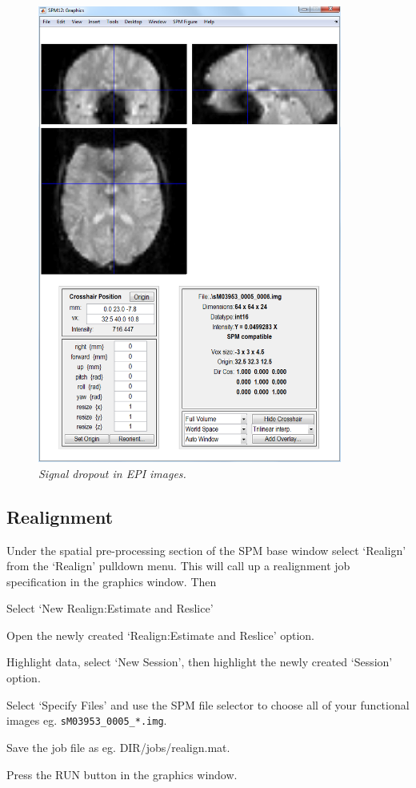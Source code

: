 \begin{figure}
\begin{center}
\includegraphics[width=100mm]{faces/dropout}
\caption{\em Signal dropout in EPI images. \label{dropout}}
\end{center}
\end{figure}

\subsection{Realignment}

Under the spatial pre-processing section of the SPM base window select `Realign' from the `Realign' pulldown menu. This will call up a realignment job specification in the graphics window. Then

\bi
\item{Select `New Realign:Estimate and Reslice'}
\item{Open the newly created `Realign:Estimate and Reslice' option.}
\item{Highlight data, select `New Session', then highlight the newly created `Session' option.} 
\item{Select `Specify Files' and use the SPM file selector to choose all of your functional images eg. \verb!sM03953_0005_*.img!.}
\item{Save the job file as eg. {\sf DIR/jobs/realign.mat}}.
\item{Press the RUN button in the graphics window.}
\ei

